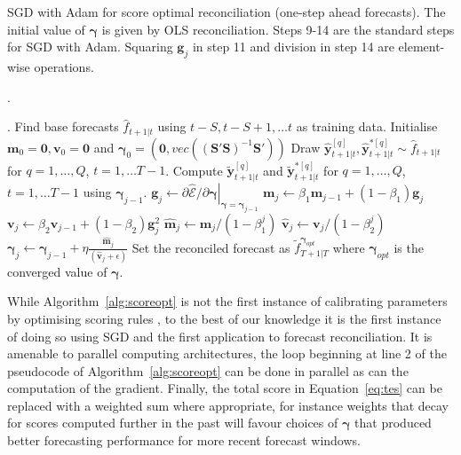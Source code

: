\documentclass[12pt]{article}
\theoremstyle{definition}
\begin{document}
\begin{algorithm}
	\caption{SGD with Adam for score optimal reconciliation (one-step ahead forecasts).  The initial value of $\bm{\gamma}$ is given by OLS reconciliation.  Steps 9-14 are the standard steps for SGD with Adam.  Squaring $\bm{g}_j$ in step 11 and division in step 14 are element-wise operations.}\label{alg:scoreopt}.
	\begin{algorithmic}[1]
		.
		  \State Find base forecasts $\hat{f}_{t+1|t}$ using $t-S,t-S+1,\ldots t$ as training data.		
		\EndFor
		\State Initialise $\bm{m}_0=\bm{0}, \bm{v}_0=\bm{0}$ and $\bm{\gamma}_0=\left(\bm{0},vec\left((\bm{S}'\bm{S})^{-1}\bm{S}'\right)\right)$ 
		\State Draw ${\hat{\bm{y}}}^{[q]}_{t+1|t},{\hat{\bm{y}}}^{*[q]}_{t+1|t}\sim \hat{f}_{t+1|t}$ for $q=1,\ldots,Q$, $t=1,\ldots T-1$.
		\State Compute $\tilde{\bm{y}}^{[q]}_{t+1|t}$ and $\tilde{\bm{y}}^{*[q]}_{t+1|t}$ for $q=1,\ldots,Q$, $t=1,\ldots T-1$ using $\bm{\gamma}_{j-1}$.
		\State $\bm{g}_j \gets \left.\partial\hat{\mathcal{E}}/\partial{\bm{\gamma}}\right|_{\bm{\gamma}=\bm{\gamma}_{j-1}}$ 
		\State $\bm{m}_j\gets\beta_1\bm{m}_{j-1}+(1-\beta_1)\bm{g}_j$ 
		\State $\bm{v}_j\gets\beta_2\bm{v}_{j-1}+(1-\beta_2)\bm{g}^2_j$ 
		\State $\hat{\bm{m}}_j\gets \bm{m}_j/(1-\beta_1^j)$ 
		\State $\hat{\bm{v}}_j\gets \bm{v}_j/(1-\beta_2^j)$ 
		\State $\bm{\gamma}_j\gets\bm{\gamma}_{j-1}+\eta\frac{\hat{\bm{m}}_j}{(\hat{\bm{v}}_j+\epsilon)}$ 
		\EndFor
		\State Set the reconciled forecast as $\tilde{f}^{\bm{\gamma}_{opt}}_{T+1|T}$ where $\bm{\gamma}_{opt}$ is the converged value of $\bm{\gamma}$.
		\EndProcedure
	\end{algorithmic}
\end{algorithm}

While Algorithm~\ref{alg:scoreopt} is not the first instance of calibrating parameters by optimising scoring rules \citep[see][for an example]{gneiting2005}, to the best of our knowledge it is the first instance of doing so using SGD and the first application to forecast reconciliation.  It is amenable to parallel computing architectures, the loop beginning at line 2 of the pseudocode of Algorithm~\ref{alg:scoreopt} can be done in parallel as can the computation of the gradient.  Finally, the total score in Equation~\ref{eq:tes} can be replaced with a weighted sum where appropriate, for instance weights that decay for scores computed further in the past will favour choices of $\bm{\gamma}$ that produced better forecasting performance for more recent forecast windows.
\end{document}
